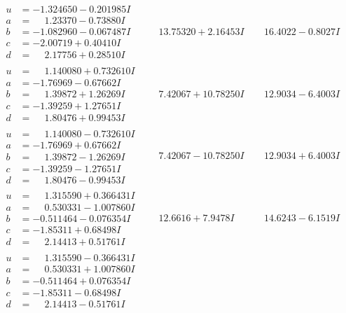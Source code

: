 \documentclass[1p]{elsarticle_modified}
\theoremstyle{definition}
\begin{document}
$$\begin{array}{c|c|c}
\begin{aligned}
u &= -1.324650 - 0.201985 I \\
a &= \phantom{-}1.23370 - 0.73880 I \\
b &= -1.082960 - 0.067487 I \\
c &= -2.00719 + 0.40410 I \\
d &= \phantom{-}2.17756 + 0.28510 I\end{aligned}
 & \phantom{-}13.75320 + 2.16453 I & \phantom{-}16.4022 - 0.8027 I \\ \hline\begin{aligned}
u &= \phantom{-}1.140080 + 0.732610 I \\
a &= -1.76969 - 0.67662 I \\
b &= \phantom{-}1.39872 + 1.26269 I \\
c &= -1.39259 + 1.27651 I \\
d &= \phantom{-}1.80476 + 0.99453 I\end{aligned}
 & \phantom{-}7.42067 + 10.78250 I & \phantom{-}12.9034 - 6.4003 I \\ \hline\begin{aligned}
u &= \phantom{-}1.140080 - 0.732610 I \\
a &= -1.76969 + 0.67662 I \\
b &= \phantom{-}1.39872 - 1.26269 I \\
c &= -1.39259 - 1.27651 I \\
d &= \phantom{-}1.80476 - 0.99453 I\end{aligned}
 & \phantom{-}7.42067 - 10.78250 I & \phantom{-}12.9034 + 6.4003 I \\ \hline\begin{aligned}
u &= \phantom{-}1.315590 + 0.366431 I \\
a &= \phantom{-}0.530331 - 1.007860 I \\
b &= -0.511464 - 0.076354 I \\
c &= -1.85311 + 0.68498 I \\
d &= \phantom{-}2.14413 + 0.51761 I\end{aligned}
 & \phantom{-}12.6616 + 7.9478 I & \phantom{-}14.6243 - 6.1519 I \\ \hline\begin{aligned}
u &= \phantom{-}1.315590 - 0.366431 I \\
a &= \phantom{-}0.530331 + 1.007860 I \\
b &= -0.511464 + 0.076354 I \\
c &= -1.85311 - 0.68498 I \\
d &= \phantom{-}2.14413 - 0.51761 I\end{aligned}

\end{array}$$
\end{document}
